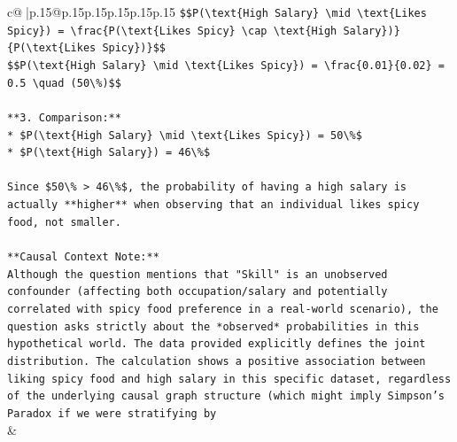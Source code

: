 \documentclass{article}
\begin{document}
{\begin{supertabular}{c@{$\;$}|p{.15\linewidth}@{}p{.15\linewidth}p{.15\linewidth}p{.15\linewidth}p{.15\linewidth}p{.15\linewidth}}
{{{\texttt{\$\$P(\textbackslash{}text\{High Salary\} \textbackslash{}mid \textbackslash{}text\{Likes Spicy\}) = \textbackslash{}frac\{P(\textbackslash{}text\{Likes Spicy\} \textbackslash{}cap \textbackslash{}text\{High Salary\})\}\{P(\textbackslash{}text\{Likes Spicy\})\}\$\$} \\
\texttt{\$\$P(\textbackslash{}text\{High Salary\} \textbackslash{}mid \textbackslash{}text\{Likes Spicy\}) = \textbackslash{}frac\{0.01\}\{0.02\} = 0.5 \textbackslash{}quad (50\textbackslash{}\%)\$\$} \\
\\ 
\texttt{**3. Comparison:**} \\
\texttt{*   \$P(\textbackslash{}text\{High Salary\} \textbackslash{}mid \textbackslash{}text\{Likes Spicy\}) = 50\textbackslash{}\%\$} \\
\texttt{*   \$P(\textbackslash{}text\{High Salary\}) = 46\textbackslash{}\%\$} \\
\\ 
\texttt{Since \$50\textbackslash{}\% > 46\textbackslash{}\%\$, the probability of having a high salary is actually **higher** when observing that an individual likes spicy food, not smaller.} \\
\\ 
\texttt{**Causal Context Note:**} \\
\texttt{Although the question mentions that "Skill" is an unobserved confounder (affecting both occupation/salary and potentially correlated with spicy food preference in a real{-}world scenario), the question asks strictly about the *observed* probabilities in this hypothetical world. The data provided explicitly defines the joint distribution. The calculation shows a positive association between liking spicy food and high salary in this specific dataset, regardless of the underlying causal graph structure (which might imply Simpson's Paradox if we were stratifying by} \\
            }
        }
    }
    & \\ \\


\end{supertabular}}
\end{document}
